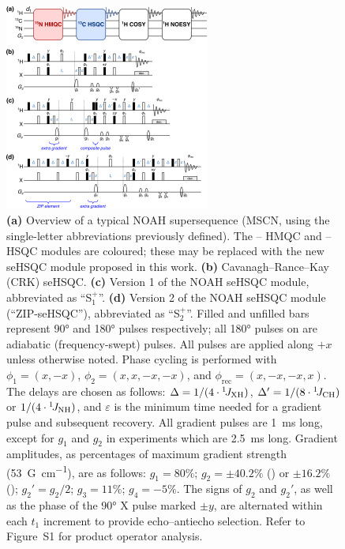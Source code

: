 \documentclass[final,twocolumn]{elsarticle}
\newcommand*{\noahSpa}{S$^+_1$}
\newcommand*{\noahSpb}{S$^+_2$}
\newcommand*{\carbon}{\ce{^{13}C}}
\newcommand*{\proton}{\ce{^{1}H}}
\newcommand*{\nitrogen}{\ce{^{15}N}}
\newcommand*{\onejxh}{{}^{1}\!J_{\ce{XH}}}
\newcommand*{\onejch}{{}^{1}\!J_{\ce{CH}}}
\newcommand*{\onejnh}{{}^{1}\!J_{\ce{NH}}}
\begin{document}
\begin{figure}[!ht]
    \centering
    \includegraphics[width=0.6\textwidth]{FIG1.png}
    \caption{
        \textbf{(a)} Overview of a typical NOAH supersequence (MSCN, using the single-letter abbreviations previously defined\cite{Kupce2017ACIE}).
        The \proton{}--\nitrogen{} HMQC and \proton{}--\carbon{} HSQC modules are coloured; these may be replaced with the new seHSQC module proposed in this work.
        \textbf{(b)} Cavanagh--Rance--Kay (CRK) seHSQC.\cite{Palmer1991JMR, Kay1992JACS}
        \textbf{(c)} Version 1 of the NOAH seHSQC module, abbreviated as ``\noahSpa{}''.
        \textbf{(d)} Version 2 of the NOAH seHSQC module (``ZIP-seHSQC''), abbreviated as ``\noahSpb{}''.
        Filled and unfilled bars represent \ang{90} and \ang{180} pulses respectively; all \ang{180} pulses on \carbon{} are adiabatic (frequency-swept) pulses.
        All pulses are applied along $+x$ unless otherwise noted.
        Phase cycling is performed with $\phi_1 = (x, -x)$, $\phi_2 = (x, x, -x, -x)$, and $\phi_{\mathrm{rec}} = (x, -x, -x, x)$.
        The delays are chosen as follows: $\Delta = 1/(4\cdot\onejxh)$, $\Delta' = 1/(8\cdot\onejch)$ or $1/(4\cdot\onejnh)$, and $\varepsilon$ is the minimum time needed for a gradient pulse and subsequent recovery.
        All gradient pulses are \SI{1}{\ms} long, except for $g_1$ and $g_2$ in \nitrogen{} experiments which are \SI{2.5}{\ms} long.
        Gradient amplitudes, as percentages of maximum gradient strength (\SI{53}{G\per\cm}), are as follows: $g_1 = 80\%$; $g_2 = \pm 40.2\%$ (\carbon{}) or $\pm 16.2\%$ (\nitrogen{}); ${g_2}' = g_2/2$; $g_3 = 11\%$; $g_4 = -5\%$.
        The signs of $g_2$ and ${g_2}'$, as well as the phase of the \ang{90} X pulse marked $\pm y$, are alternated within each $t_1$ increment to provide echo--antiecho selection.
        Refer to Figure~S1 for product operator analysis.
    }
    \label{fig:pprogs}
\end{figure}
\end{document}
